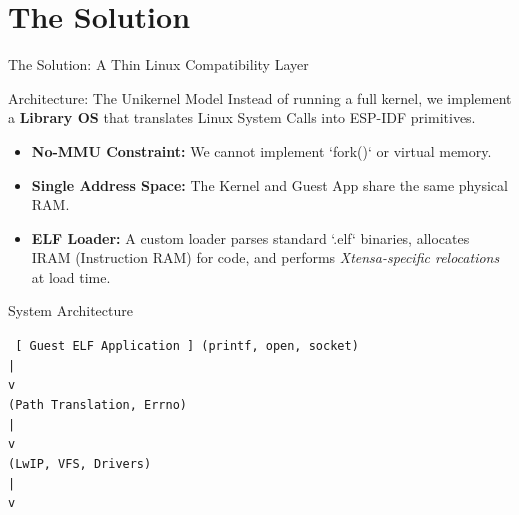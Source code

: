 \documentclass{beamer}
\begin{document}
\section{The Solution}
\begin{frame}{The Solution: A Thin Linux Compatibility Layer}
    \begin{block}{Architecture: The Unikernel Model}
        Instead of running a full kernel, we implement a \textbf{Library OS} that translates Linux System Calls into ESP-IDF primitives.
    \end{block}

    \begin{itemize}
        \item \textbf{No-MMU Constraint:} We cannot implement `fork()` or virtual memory.
        \item \textbf{Single Address Space:} The Kernel and Guest App share the same physical RAM.
        \item \textbf{ELF Loader:} A custom loader parses standard `.elf` binaries, allocates IRAM (Instruction RAM) for code, and performs \textit{Xtensa-specific relocations} at load time.
    \end{itemize}
\end{frame}

\begin{frame}{System Architecture}
    \begin{center}
    \texttt{
    [ Guest ELF Application ] (printf, open, socket)\\\n             |\\
             v\\
    [ Syscall Shim Layer ] (Path Translation, Errno)\\\n             |\\
             v\\
    [ ESP-IDF / FreeRTOS ] (LwIP, VFS, Drivers)\\\n             |\\
             v\\
    [ ESP32 Hardware ]
    }
    \end{center}
\end{frame}

\end{document}
